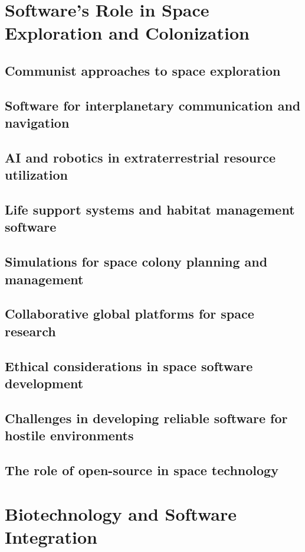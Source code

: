 \newpage

\section{Software's Role in Space Exploration and Colonization}
\subsection{Communist approaches to space exploration}
\subsection{Software for interplanetary communication and navigation}
\subsection{AI and robotics in extraterrestrial resource utilization}
\subsection{Life support systems and habitat management software}
\subsection{Simulations for space colony planning and management}
\subsection{Collaborative global platforms for space research}
\subsection{Ethical considerations in space software development}
\subsection{Challenges in developing reliable software for hostile environments}
\subsection{The role of open-source in space technology}

\newpage

\section{Biotechnology and Software Integration}
